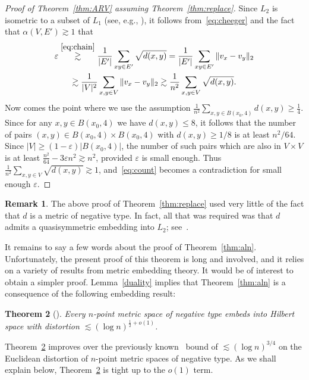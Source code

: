 \documentclass{icm2010}
\newtheorem{theorem}{Theorem}[section]
\theoremstyle{definition}
\newcommand{\1}{\mathbf{1}}
\renewcommand{\le}{\leqslant}
\renewcommand{\ge}{\geqslant}
\newcommand{\e}{\varepsilon}
\newtheorem{rem}[theorem]{Remark}
\begin{document}
\begin{proof}[Proof of Theorem~\ref{thm:ARV} assuming Theorem~\ref{thm:replace}]
Since $L_2$ is isometric to a subset of $L_1$ (see, e.g., \cite{Woj91}), it follows from~\eqref{eq:cheeger} and the fact that $\alpha(V,E')\gtrsim 1$ that
\begin{multline}\label{eq:count}
\e\stackrel{\eqref{eq:chain}}{\gtrsim} \frac{1}{|E'|}\sum_{xy\in E'}\sqrt{d(x,y)}=\frac{1}{|E'|}\sum_{xy\in E'}\|v_x-v_y\|_2\\\gtrsim \frac{1}{|V|^2}\sum_{x,y\in V}\|v_x-v_y\|_2\gtrsim \frac{1}{n^2}\sum_{x,y\in V}\sqrt{d(x,y)}.
\end{multline}
Now comes the point where we use the assumption $\frac{1}{n^2}\sum_{x,y\in B(x_0,4)}d(x,y)\ge\frac14$. Since for any $x,y\in B(x_0,4)$ we have $d(x,y)\le 8$, it follows that the number of pairs $(x,y)\in B(x_0,4)\times B(x_0,4)$ with $d(x,y)\ge 1/8$ is at least $n^2/64$. Since $|V|\ge (1-\e)|B(x_0,4)|$, the number of such pairs which are also in $V\times V$ is at least $\frac{n^2}{64}-3\e n^2\gtrsim n^2$, provided $\e$ is small enough. Thus $\frac{1}{n^2}\sum_{x,y\in V}\sqrt{d(x,y)}\gtrsim 1$, and~\eqref{eq:count} becomes a contradiction for small enough $\e$.
\end{proof}

\begin{rem}
The above proof of Theorem~\ref{thm:replace} used very little of the
fact that $d$ is a metric of negative type. In fact, all that was
required was that $d$ admits a quasisymmetric embedding into $L_2$;
see~\cite{NRS05}.
\end{rem}


It remains to say a few words about the proof of
Theorem~\ref{thm:aln}. Unfortunately, the present proof of this
theorem is long and involved, and it relies on a variety of results
from metric embedding theory. It would be of interest to obtain a
simpler proof. Lemma~\ref{duality} implies that
Theorem~\ref{thm:aln} is a consequence of the following embedding
result:

\begin{theorem}[\cite{ALN08}]\label{thm:embed ALN}
Every $n$-point metric space of negative type embeds into Hilbert
space with distortion $\lesssim (\log n)^{\frac12+o(1)}$.
\end{theorem}
Theorem~\ref{thm:embed ALN} improves over the previously
known~\cite{CGR08} bound of $\lesssim (\log n)^{3/4}$ on the
Euclidean distortion of $n$-point metric spaces of negative type. As
we shall explain below, Theorem~\ref{thm:embed ALN} is tight up to the $o(1)$ term.
\end{document}
